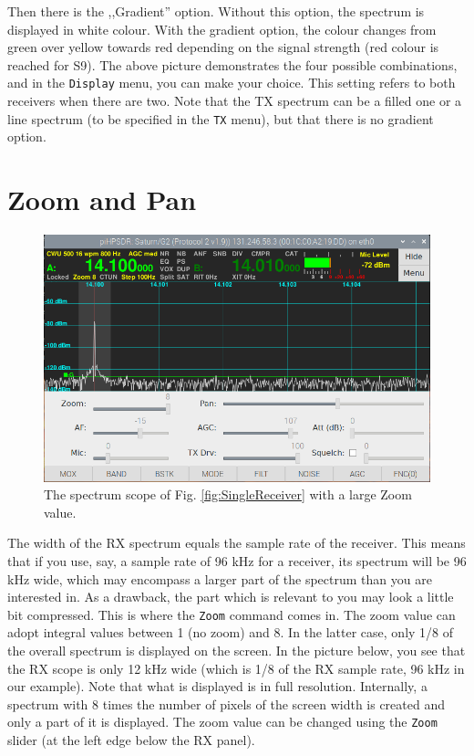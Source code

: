 \documentclass[12pt]{book}
\def\rett#1{\texttt{\color{red}#1}}
\def\bltt#1{\texttt{\color{blue}#1}}
\begin{document}
Then there is the ,,Gradient'' option. Without this option, the
spectrum is displayed in white colour. With the gradient option,
the colour changes from green over yellow towards red depending
on the signal strength (red colour is reached for S9). The above
picture demonstrates the four possible combinations, and in
the \bltt{Display} menu, you can make your choice. This setting
refers to both receivers when there are two. Note that the TX
spectrum can be a filled one or a line spectrum (to be specified
in the \bltt{TX} menu), but that there
is no gradient option.

\section{Zoom and Pan}
\label{sec:ZoomPanArea}

\begin{figure}[ht]
\center
\includegraphics[width=12cm]{ZoomPan.png}
\caption{The spectrum scope of Fig. \ref{fig:SingleReceiver} with a
large Zoom value.}
\end{figure}

The width of the RX spectrum equals the sample rate
of the receiver. This means that if you use, say,
a sample rate of 96 kHz for a receiver, its spectrum
will be 96 kHz wide, which may encompass a larger part
of the spectrum than you are interested in. As a drawback,
the part which is relevant to you may look a little bit
compressed. This is where the \bltt{Zoom} command
comes in. The zoom value can adopt integral values between
1 (no zoom) and 8. In the latter case, only 1/8 of the
overall spectrum is displayed on the screen. In the
picture below, you see that the RX scope is only 12 kHz
wide (which is 1/8 of the RX sample rate, 96 kHz in our
example). Note that what is displayed is in full resolution.
Internally, a spectrum with 8 times the number of pixels
of the screen width is created and only a part of it is
displayed. The zoom value can be changed using the \rett{Zoom}
slider (at the left edge below the RX panel).
\end{document}
